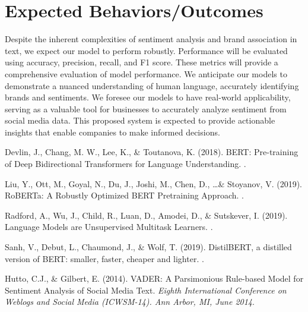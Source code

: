 \documentclass{article}
\begin{document}
\section{Expected Behaviors/Outcomes}

Despite the inherent complexities of sentiment analysis and brand association
in text, we expect our model to perform robustly. Performance will be evaluated
using accuracy, precision, recall, and F1 score. These metrics will provide a
comprehensive evaluation of model performance. We anticipate our models to
demonstrate a nuanced understanding of human language, accurately identifying
brands and sentiments. We foresee our models to have real-world applicability,
serving as a valuable tool for businesses to accurately analyze sentiment from
social media data. This proposed system is expected to provide actionable
insights that enable companies to make informed decisions.

\begin{thebibliography}{}

    Devlin, J., Chang, M. W., Lee, K., \& Toutanova, K. (2018). \newblock BERT:
    Pre-training of Deep Bidirectional Transformers for Language Understanding.
    .

    Liu, Y., Ott, M., Goyal, N., Du, J., Joshi, M., Chen, D., \ldots \&
    Stoyanov, V. (2019). \newblock RoBERTa: A Robustly Optimized BERT
    Pretraining
    Approach. .

    Radford, A., Wu, J., Child, R., Luan, D., Amodei, D., \& Sutskever, I.
    (2019). \newblock Language Models are Unsupervised Multitask Learners.
    .

    Sanh, V., Debut, L., Chaumond, J., \& Wolf, T. (2019). \newblock
    DistilBERT, a distilled version of BERT: smaller, faster, cheaper and
    lighter.
    .

    Hutto, C.J., \& Gilbert, E. (2014). \newblock VADER: A Parsimonious
    Rule-based Model for Sentiment Analysis of Social Media Text. \newblock
    {\em
        Eighth International Conference on Weblogs and Social Media (ICWSM-14).
        Ann
        Arbor, MI, June 2014}.

\end{thebibliography}

\thispagestyle{empty}
\end{document}
